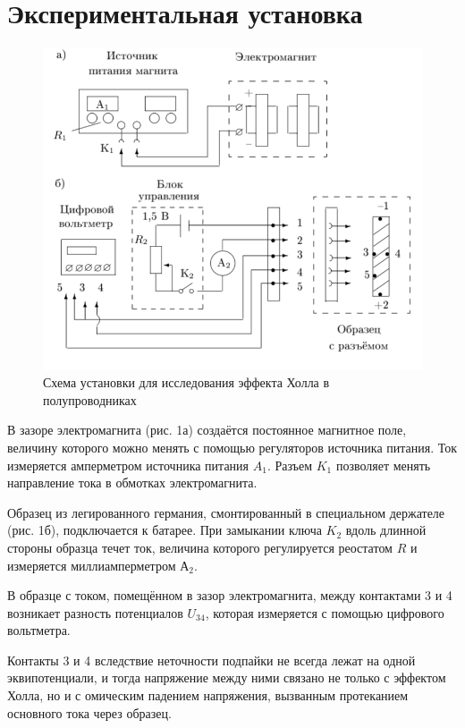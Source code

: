\documentclass[a4paper,14pt]{article}
\begin{document}
\section*{Экспериментальная установка}

\begin{center}
	\begin{figure}[bhtp]
		\centering
		\includegraphics[width=0.8\linewidth]{scheme.png}
		\caption{Схема установки для исследования эффекта Холла в полупроводниках}
		\label{scheme}
	\end{figure}
\end{center}

	В зазоре электромагнита (рис. 1а) создаётся постоянное магнитное поле, величину которого можно менять с помощью регуляторов источника питания. Ток измеряется амперметром источника питания $A_{1}$. Разъем $K_{1}$ позволяет менять направление тока в обмотках электромагнита.

Образец из легированного германия, смонтированный в специальном держателе (рис. 1б), подключается к батарее. При замыкании ключа $K_{2}$ вдоль длинной стороны образца течет ток, величина которого регулируется реостатом $R$ и измеряется миллиамперметром $А_{2}$.

В образце с током, помещённом в зазор электромагнита, между контактами 3 и 4 возникает разность потенциалов $U_{34}$, которая измеряется с помощью цифрового вольтметра.

Контакты 3 и 4 вследствие неточности подпайки не всегда лежат на одной
эквипотенциали, и тогда напряжение между ними связано не только с эффектом
Холла, но и с омическим падением напряжения, вызванным протеканием основного тока через образец.
\end{document}

